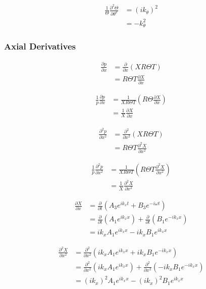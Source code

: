\documentclass[a4paper]{article}
\begin{document}
\begin{align*}
    \frac{1}{\Theta}\frac{\partial^2 \Theta}{\partial \theta^2} 
    &=
    (ik_{\theta})^2 \\
    &= -k_{\theta}^2
\end{align*}

\subsubsection{Axial Derivatives}

\begin{align*}
    \frac{\partial p}{\partial x} 
    &=
    \frac{\partial }{\partial x}  \left( XR\Theta T \right) \\
    &=
    R\Theta T \frac{\partial X}{\partial x}  
\end{align*}


\begin{align*}
    \frac{1}{p}\frac{\partial p}{\partial x} 
    &=
    \frac{ 1}{X R \Theta T}  \left( R\Theta\frac{\partial X}{\partial x} \right) \\
    &=\frac{ 1}{ X}\frac{\partial X}{\partial x}  
\end{align*}

\begin{align*}
    \frac{\partial^2 p}{\partial x^2} 
    &=
    \frac{\partial^2 }{\partial x^2}  \left( XR\Theta T \right) \\
    &=
    R\Theta T \frac{\partial^2 X}{\partial x^2}  
\end{align*}


\begin{align*}
    \frac{1}{p}\frac{\partial^2 p}{\partial x^2} 
    &=
    \frac{ 1}{X R \Theta T}  \left( R\Theta T \frac{\partial^2 X}{\partial x^2} \right) \\
    &=\frac{ 1}{ X}\frac{\partial^2 X}{\partial x^2}  
\end{align*}

\begin{align*}
    \frac{\partial X}{\partial x} &=
    \frac{\partial}{\partial t}
        \left( 
        A_3 e^{i k_x t} + B_3 e^{-i \omega t}
    \right)  \\
    &=
    \frac{\partial}{\partial t} \left(A_1 e^{i k_x x}  \right) +
    \frac{\partial}{\partial t} \left(B_1 e^{-i k_x x }  \right)\\ 
    &= i k_x A_1 e^{i k_x x } - i k_x B_1 e^{i k_x x} 
\end{align*}

\begin{align*}
    \frac{\partial^2 X}{\partial x^2} &=
    \frac{\partial^2}{\partial x^2}
        \left( 
        i k_x A_1 e^{i k_x x} + i k_x B_1 e^{-i k_x x}
    \right)  \\
    &=
    \frac{\partial^2}{\partial x^2} \left(i k_x A_1 e^{i k_x x}  \right) +
    \frac{\partial^2}{\partial x^2} \left(- i k_x B_1 e^{-i k_x x}  \right)\\ 
    &= (i k_x)^2 A_1 e^{i k_x x} - (i k_x)^2 B_1 e^{i k_x x} 
\end{align*}
\end{document}
